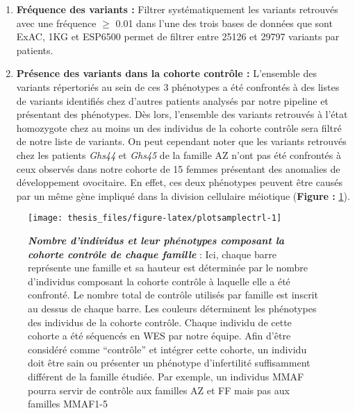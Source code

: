 \documentclass[12pt,twoside]{ugathesis}
\begin{document}
\begin{enumerate}
\def\labelenumi{\arabic{enumi}.}
\setcounter{enumi}{4}
\item
  \textbf{Fréquence des variants :} Filtrer systématiquement les
  variants retrouvés avec une fréquence \(\ge\) 0.01 dans l'une des
  trois bases de données que sont ExAC, 1KG et ESP6500 permet de filtrer
  entre 25126 et 29797 variants par patients.
\item
  \textbf{Présence des variants dans la cohorte contrôle :} L'ensemble
  des variants répertoriés au sein de ces 3 phénotypes a été confrontés
  à des listes de variants identifiés chez d'autres patients analysés
  par notre pipeline et présentant des phénotypes. Dès lors, l'ensemble
  des variants retrouvés à l'état homozygote chez au moins un des
  individus de la cohorte contrôle sera filtré de notre liste de
  variants. On peut cependant noter que les variants retrouvés chez les
  patients \emph{Ghs44} et \emph{Ghs45} de la famille AZ n'ont pas été
  confrontés à ceux observés dans notre cohorte de 15 femmes présentant
  des anomalies de développement ovocitaire. En effet, ces deux
  phénotypes peuvent être causés par un même gène impliqué dans la
  division cellulaire méiotique (\textbf{Figure :}
  \ref{fig:plotsamplectrl}).\\
  \newpage
\end{enumerate}

\begin{figure}

{\centering \texttt{[image: thesis\_files/figure-latex/plotsamplectrl-1]} 

}

\caption[Nombre d'individus et leur phénotypes composant la cohorte contrôle de chaque famille]{\textbf{\emph{Nombre d'individus et leur phénotypes
composant la cohorte contrôle de chaque famille}} : Ici, chaque barre
représente une famille et sa hauteur est déterminée par le nombre
d'individus composant la cohorte contrôle à laquelle elle a été
confronté. Le nombre total de contrôle utilisés par famille est inscrit
au dessus de chaque barre. Les couleurs déterminent les phénotypes des
individus de la cohorte contrôle. Chaque individu de cette cohorte a été
séquencés en WES par notre équipe. Afin d'être considéré comme
``contrôle'' et intégrer cette cohorte, un individu doit être sain ou
présenter un phénotype d'infertilité suffisamment différent de la
famille étudiée. Par exemple, un individus MMAF pourra servir de
contrôle aux familles AZ et FF mais pas aux familles MMAF1-5}\label{fig:plotsamplectrl}
\end{figure}
\end{document}

